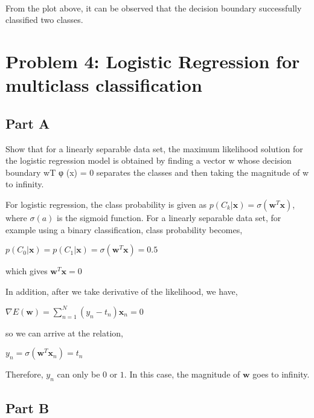 \documentclass[11pt]{article}
\begin{document}
    \begin{center}
    \end{center}
    { \hspace*{\fill} \\}
    
    From the plot above, it can be observed that the decision boundary
successfully classified two classes.

    \hypertarget{problem-4-logistic-regression-for-multiclass-classification}{%
\section{Problem 4: Logistic Regression for multiclass
classification}\label{problem-4-logistic-regression-for-multiclass-classification}}

    \hypertarget{part-a}{%
\subsection{Part A}\label{part-a}}

Show that for a linearly separable data set, the maximum likelihood
solution for the logistic regression model is obtained by finding a
vector w whose decision boundary wT φ (x) = 0 separates the classes and
then taking the magnitude of w to infinity.

    For logistic regression, the class probability is given as
\(p(C_k|\mathbf{x}) = \sigma(\mathbf{w}^T\mathbf{x})\), where
\(\sigma(a)\) is the sigmoid function. For a linearly separable data
set, for example using a binary classification, class probability
becomes,

\(p(C_0|\mathbf{x}) = p(C_1|\mathbf{x}) = \sigma(\mathbf{w}^T\mathbf{x}) = 0.5\)

which gives \(\mathbf{w}^T\mathbf{x} = 0\)

In addition, after we take derivative of the likelihood, we have,

\(\nabla E(\mathbf{w}) = \sum_{n=1}^N(y_n - t_n)\mathbf{x}_n = 0\)

so we can arrive at the relation,

\(y_n = \sigma(\mathbf{w}^T\mathbf{x}_n) = t_n\)

Therefore, \(y_n\) can only be \(0\) or \(1\). In this case, the
magnitude of \(\mathbf{w}\) goes to infinity.

    \hypertarget{part-b}{%
\subsection{Part B}\label{part-b}}
\end{document}
